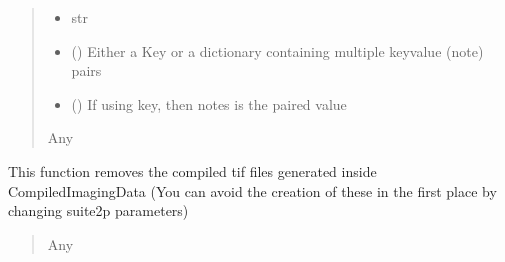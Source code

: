 \documentclass[letterpaper,10pt,english]{sphinxmanual}
\begin{document}
\begin{fulllineitems}
\begin{fulllineitems}
\begin{quote}
\begin{description}
\begin{itemize}
\item {} 
\sphinxAtStartPar
{} \textendash{} str

\item {} 
\sphinxAtStartPar
{} (\sphinxstyleliteralemphasis{\sphinxupquote{{[}}}\sphinxstyleliteralemphasis{\sphinxupquote{, }}\sphinxstyleliteralemphasis{\sphinxupquote{{]}}}) \textendash{} Either a Key or a dictionary containing multiple key\sphinxhyphen{}value (note) pairs

\item {} 
\sphinxAtStartPar
{} (\sphinxstyleliteralemphasis{\sphinxupquote{{[}}}\sphinxstyleliteralemphasis{\sphinxupquote{{]}}}) \textendash{} If using key, then notes is the paired value

\end{itemize}

\sphinxAtStartPar
Any

\end{description}\end{quote}

\end{fulllineitems}


\begin{fulllineitems}
\label{\detokenize{Organization:Organization.ImagingAnalysis.clean_up_compilation}}
\pysigstartsignatures
{}
\pysigstopsignatures
\sphinxAtStartPar
This function removes the compiled tif files generated inside CompiledImagingData
(You can avoid the creation of these in the first place by changing suite2p parameters)
\begin{quote}\begin{description}
\sphinxAtStartPar
Any

\end{description}\end{quote}


\end{fulllineitems}
\end{fulllineitems}
\end{document}
